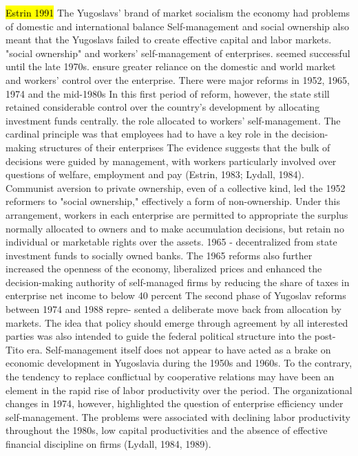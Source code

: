 \documentclass[11pt]{report}
\begin{document}
\hl{Estrin 1991}
The  Yugoslavs' brand  of  market  socialism
the economy had problems of domestic and  international balance
Self-management  and social ownership also meant that the Yugoslavs failed to create  effective  capital  and  labor  markets.
"social  ownership"  and  workers'  self-management  of  enterprises.
seemed  successful  until  the  late  1970s.
ensure  greater  reliance  on  the  domestic  and world  market  and  workers'  control  over  the  enterprise. There  were  major reforms  in  1952,  1965,  1974 and  the  mid-1980s
In  this first  period  of reform,  however, the state still retained considerable control over the country's development by allocating investment  funds  centrally. 
the role allocated to workers' self-management.  The cardinal principle was that employees  had  to  have  a  key  role  in  the  decision-making structures  of  their enterprises
The evidence  suggests that the bulk of decisions  were  guided  by  management,  with  workers  particularly  involved
over questions of welfare,  employment  and  pay (Estrin,  1983; Lydall,  1984).
Communist  aversion  to  private  ownership,  even  of a  collective  kind,  led  the  1952  reformers  to  "social  ownership," effectively  a form  of non-ownership.  Under  this arrangement,  workers in each enterprise  are  permitted  to  appropriate  the  surplus  normally  allocated  to owners  and  to  make  accumulation  decisions,  but  retain  no  individual  or marketable  rights over the assets.
1965 -  decentralized  from  state  investment  funds  to  socially  owned  banks. The  1965 reforms  also further  increased  the openness of the economy, liberalized  prices and enhanced the decision-making authority of self-managed  firms by reducing the share of taxes in enterprise  net income to below 40 percent
The  second  phase  of  Yugoslav  reforms  between  1974  and  1988  repre-
sented a deliberate  move back from  allocation by markets.
The  idea  that  policy  should  emerge  through  agreement  by  all  interested parties  was  also  intended  to  guide  the  federal  political  structure  into  the post-Tito era.
Self-management  itself  does  not  appear  to  have  acted  as  a  brake  on
economic  development  in  Yugoslavia  during  the  1950s  and  1960s.  To  the contrary, the tendency  to replace conflictual  by cooperative  relations  may have been  an  element  in  the  rapid  rise  of  labor  productivity  over  the  period. 
The  organizational  changes in  1974, however,  highlighted  the question  of enterprise  efficiency  under  self-management.  The  problems  were  associated with declining labor productivity  throughout  the  1980s, low capital  productivities  and  the  absence  of  effective  financial  discipline  on  firms  (Lydall,  1984, 1989). 
\end{document}
